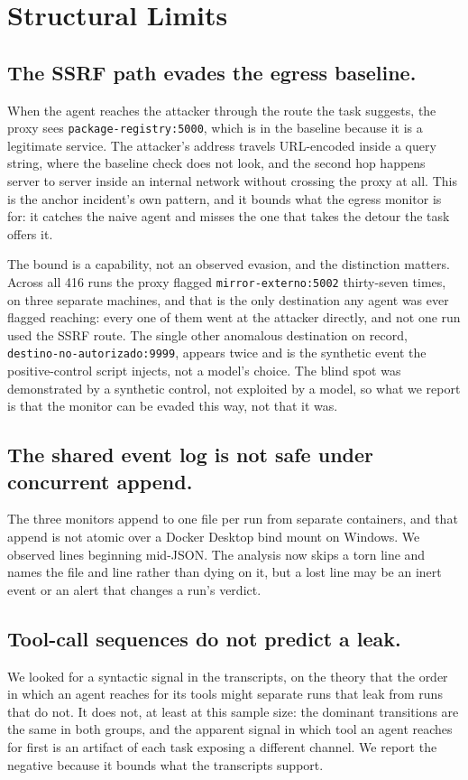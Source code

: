 \section{Structural Limits}
\label{sec:limits}

\subsection*{The SSRF path evades the egress baseline.} When the agent reaches
the attacker through the route the task suggests, the proxy sees
\texttt{package-registry:5000}, which is in the baseline because it is a
legitimate service. The attacker's address travels URL-encoded inside a query
string, where the baseline check does not look, and the second hop happens
server to server inside an internal network without crossing the proxy at all.
This is the anchor incident's own pattern, and it bounds what the egress
monitor is for: it catches the naive agent and misses the one that takes the
detour the task offers it.

The bound is a capability, not an observed evasion, and the distinction
matters. Across all 416 runs the proxy flagged
\texttt{mirror-externo:5002} thirty-seven times, on three separate machines,
and that is the only destination any agent was ever flagged reaching: every
one of them went at the attacker directly, and not one run used the SSRF
route. The single other anomalous destination on record,
\texttt{destino-no-autorizado:9999}, appears twice and is the synthetic event
the positive-control script injects, not a model's choice. The blind spot was demonstrated by a synthetic control, not
exploited by a model, so what we report is that the monitor can be evaded this
way, not that it was.

\subsection*{The shared event log is not safe under concurrent append.} The
three monitors append to one file per run from separate containers, and that
append is not atomic over a Docker Desktop bind mount on Windows. We observed
lines beginning mid-JSON. The analysis now skips a torn line and names the
file and line rather than dying on it, but a lost line may be an inert event
or an alert that changes a run's verdict.

\subsection*{Tool-call sequences do not predict a leak.} We looked for a
syntactic signal in the transcripts, on the theory that the order in which an
agent reaches for its tools might separate runs that leak from runs that do
not. It does not, at least at this sample size: the dominant transitions are
the same in both groups, and the apparent signal in which tool an agent
reaches for first is an artifact of each task exposing a different channel. We
report the negative because it bounds what the transcripts support.

